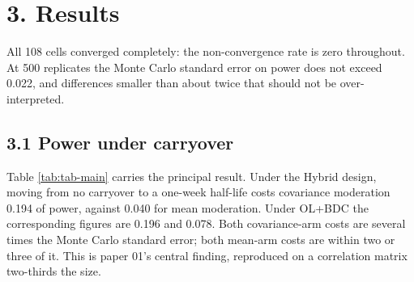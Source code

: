 \documentclass[
  11pt,
]{article}
\begin{document}
\section{3. Results}

All 108 cells converged completely: the non-convergence rate is zero
throughout. At 500 replicates the Monte Carlo standard error on
power does not exceed 0.022,
and differences smaller than about twice that should not be
over-interpreted.

\subsection{3.1 Power under carryover}

\begin{table}
\centering
\caption{\label{tab:tab-main}Power by architecture, trial design and carryover
    half-life at $c_{bm} = 0.30$, $N = 70$, 500 replicates per cell.
    Cost is the power lost in moving from no carryover to a one-week
    half-life. Absolute power is not comparable between architectures
    at a common nominal $c_{bm}$; the interpretable quantity is the
    profile across half-life within each architecture.}
\centering
{}
\end{table}

Table \ref{tab:tab-main} carries the principal result. Under the
Hybrid design, moving from no carryover to a one-week half-life costs
covariance moderation
0.194
of power, against
0.040
for mean moderation. Under OL+BDC the corresponding figures are
0.196
and
0.078.
Both covariance-arm costs are several times the Monte Carlo standard
error; both mean-arm costs are within two or three of it. This is
paper 01's central finding, reproduced on a correlation matrix
two-thirds the size.
\end{document}
